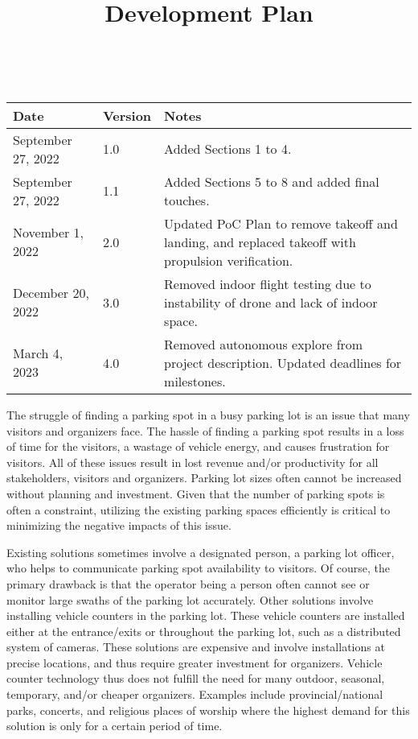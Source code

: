 \documentclass{article}
\title{Development Plan\\\progname}
\author{\authname}
\date{}
\begin{document}
\maketitle
\thispagestyle{empty}

~\newpage


\begin{tabularx}{\textwidth}{p{3cm}p{2cm}X}
\toprule {\bf Date} & {\bf Version} & {\bf Notes}\\
\midrule
September 27, 2022 & 1.0 & Added Sections 1 to 4. \\
September 27, 2022 & 1.1 & Added Sections 5 to 8 and added final touches. \\
November 1, 2022 & 2.0 & Updated PoC Plan to remove takeoff and landing, and replaced takeoff with propulsion verification. \\
December 20, 2022 & 3.0 & Removed indoor flight testing due to instability of drone and lack of indoor space. \\
March 4, 2023 & 4.0 & Removed autonomous explore from project description. Updated deadlines for milestones. \\
\bottomrule
\end{tabularx}

\newpage

\maketitle

\indent The struggle of finding a parking spot in a busy parking lot is an issue that many visitors and organizers face. The hassle of finding a parking spot results in a loss of time for the visitors, a wastage of vehicle energy, and causes frustration for visitors. All of these issues result in lost revenue and/or productivity for all stakeholders, visitors and organizers. Parking lot sizes often cannot be increased without planning and investment. Given that the number of parking spots is often a constraint, utilizing the existing parking spaces efficiently is critical to minimizing the negative impacts of this issue.


\indent Existing solutions sometimes involve a designated person, a parking lot officer, who helps to communicate parking spot availability to visitors. Of course, the primary drawback is that the operator being a person often cannot see or monitor large swaths of the parking lot accurately. Other solutions involve installing vehicle counters in the parking lot. These vehicle counters are installed either at the entrance/exits or throughout the parking lot, such as a distributed system of cameras.  These solutions are expensive and involve installations at precise locations, and thus require greater investment for organizers. Vehicle counter technology thus does not fulfill the need for many outdoor, seasonal, temporary, and/or cheaper organizers.  Examples include provincial/national parks, concerts, and religious places of worship where the highest demand for this solution is only for a certain period of time. 
\end{document}
